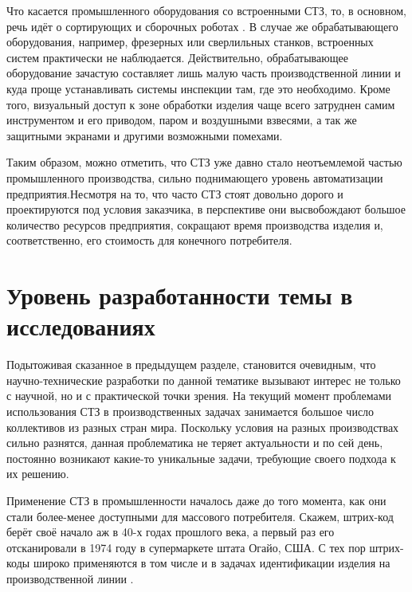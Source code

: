 Что касается промышленного оборудования со встроенными СТЗ, то, в основном, речь идёт о сортирующих и сборочных роботах \cite{ZHANG20121955}. В случае же обрабатывающего оборудования, например, фрезерных или сверлильных станков, встроенных систем практически не наблюдается. Действительно, обрабатывающее оборудование зачастую составляет лишь малую часть производственной линии и куда проще устанавливать системы инспекции там, где это необходимо. Кроме того, визуальный доступ к зоне обработки изделия чаще всего затруднен самим инструментом и его приводом, паром и воздушными взвесями, а так же защитными экранами и другими возможными помехами.

Таким образом, можно отметить, что СТЗ уже давно стало неотъемлемой частью промышленного производства, сильно поднимающего уровень автоматизации предприятия.Несмотря на то, что часто СТЗ стоят довольно дорого и проектируются под условия заказчика, в перспективе они высвобождают большое количество ресурсов предприятия, сокращают время производства изделия и, соответственно, его стоимость для конечного потребителя.

\section{Уровень разработанности темы в исследованиях} \label{sect1_3}

Подытоживая сказанное в предыдущем разделе, становится очевидным, что научно-технические разработки по данной тематике вызывают интерес не только с научной, но и с практической точки зрения. На текущий момент проблемами использования СТЗ в производственных задачах занимается большое число коллективов из разных стран мира. Поскольку условия на разных производствах сильно разнятся, данная проблематика не теряет актуальности и по сей день, постоянно возникают какие-то уникальные задачи, требующие своего подхода к их решению.

Применение СТЗ в промышленности началось даже до того момента, как они стали более-менее доступными для массового потребителя. Скажем, штрих-код берёт своё начало аж в 40-х годах прошлого века, а первый раз его отсканировали в 1974 году в супермаркете штата Огайо, США. С тех пор штрих-коды широко применяются в том числе и в задачах идентификации изделия на производственной линии \cite{barcodes}.

